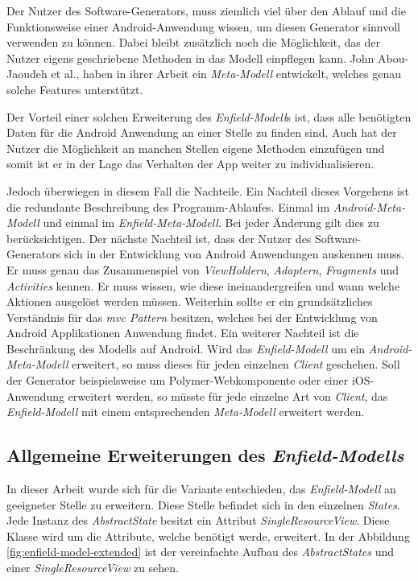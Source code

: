Der Nutzer des Software-Generators, muss ziemlich viel über den Ablauf und die Funktionsweise einer Android-Anwendung wissen, um diesen Generator sinnvoll verwenden zu können.
Dabei bleibt zusätzlich noch die Möglichkeit, das der Nutzer eigens geschriebene Methoden in das Modell einpflegen kann. John Abou-Jaoudeh et al., haben in ihrer Arbeit ein \textit{Meta-Modell} entwickelt, welches genau solche Features unterstützt\cite{abou2015high}.

Der Vorteil einer solchen Erweiterung des \textit{Enfield-Modell}s ist, dass alle benötigten Daten für die Android Anwendung an einer Stelle zu finden sind. Auch hat der Nutzer die Möglichkeit an manchen Stellen eigene Methoden einzufügen und somit ist er in der Lage das Verhalten der App weiter zu individualisieren.

Jedoch überwiegen in diesem Fall die Nachteile. Ein Nachteil dieses Vorgehens ist die redundante Beschreibung des Programm-Ablaufes. Einmal im \textit{Android-Meta-Modell} und einmal im \textit{Enfield-Meta-Modell}. Bei jeder Änderung gilt dies zu berücksichtigen. 
Der nächste Nachteil ist, dass der Nutzer des Software-Generators sich in der Entwicklung von Android Anwendungen auskennen muss. Er muss genau das Zusammenspiel von \textit{ViewHoldern}, \textit{Adaptern}, \textit{Fragments} und \textit{Activities} kennen. Er muss wissen, wie diese ineinandergreifen und wann welche Aktionen ausgelöst werden müssen. Weiterhin sollte er ein grundsätzliches Verständnis für das \textit{\acf{mvc} Pattern} besitzen, welches bei der Entwicklung von Android Applikationen Anwendung findet.
Ein weiterer Nachteil ist die Beschränkung des Modells auf Android. Wird das \textit{Enfield-Modell} um ein \textit{Android-Meta-Modell} erweitert, so muss dieses für jeden einzelnen \textit{Client} geschehen. Soll der Generator beispielsweise um Polymer-Webkomponente oder einer iOS-Anwendung erweitert werden, so müsste für jede einzelne Art von \textit{Client}, das \textit{Enfield-Modell} mit einem entsprechenden \textit{Meta-Modell} erweitert werden.

\subsection{Allgemeine Erweiterungen des \textit{Enfield-Modells}}\label{sec:generic_modell}

In dieser Arbeit wurde sich für die Variante entschieden, das \textit{Enfield-Modell} an geeigneter Stelle zu erweitern.
Diese Stelle befindet sich in den einzelnen \textit{States}. Jede Instanz des \textit{AbstractState} besitzt ein Attribut \textit{SingleResourceView}. Diese Klasse wird um die  Attribute, welche benötigt werde, erweitert. In der Abbildung \ref{fig:enfield-model-extended} ist der vereinfachte Aufbau des \textit{AbstractStates} und einer \textit{SingleResourceView} zu sehen.

